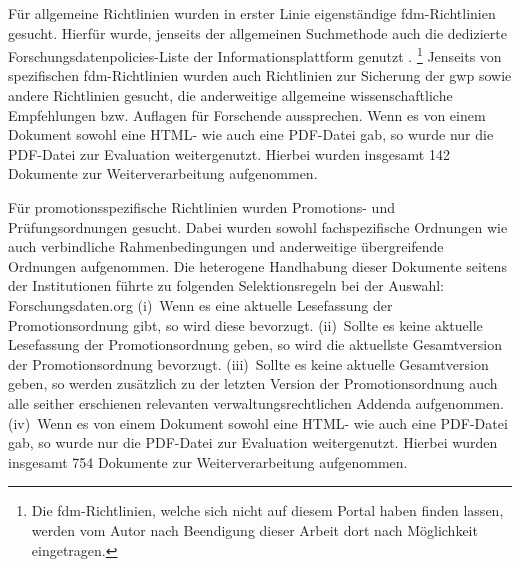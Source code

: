 Für allgemeine Richtlinien wurden in erster Linie eigenständige \gls{fdm}-Richtlinien gesucht.
Hierfür wurde, jenseits der allgemeinen Suchmethode auch die dedizierte Forschungsdatenpolicies-Liste der Informationsplattform \citeauthor{Forschungsdaten2024} genutzt \autocite{Forschungsdaten2024}.%
\footnote{%
    Die \gls{fdm}-Richtlinien, welche sich nicht auf diesem Portal haben finden lassen, werden vom Autor nach Beendigung dieser Arbeit dort nach Möglichkeit eingetragen.%
}
Jenseits von spezifischen \gls{fdm}-Richtlinien wurden auch Richtlinien zur Sicherung der \gls{gwp} sowie andere Richtlinien gesucht, die anderweitige allgemeine wissenschaftliche Empfehlungen bzw. Auflagen für Forschende aussprechen.
Wenn es von einem Dokument sowohl eine HTML- wie auch eine PDF-Datei gab, so wurde nur die PDF-Datei zur Evaluation weitergenutzt.
Hierbei wurden insgesamt \num{142} Dokumente zur Weiterverarbeitung aufgenommen.

Für promotionsspezifische Richtlinien wurden Promotions- und Prüfungsordnungen gesucht.
Dabei wurden sowohl fachspezifische Ordnungen wie auch verbindliche Rahmenbedingungen und anderweitige übergreifende Ordnungen aufgenommen.
Die heterogene Handhabung dieser Dokumente seitens der Institutionen führte zu folgenden Selektionsregeln bei der Auswahl:
Forschungsdaten.org
(i)~Wenn es eine aktuelle Lesefassung der Promotionsordnung gibt, so wird diese bevorzugt.
(ii)~Sollte es keine aktuelle Lesefassung der Promotionsordnung geben, so wird die aktuellste Gesamtversion der Promotionsordnung bevorzugt.
(iii)~Sollte es keine aktuelle Gesamtversion geben, so werden zusätzlich zu der letzten Version der Promotionsordnung auch alle seither erschienen relevanten verwaltungsrechtlichen Addenda aufgenommen.
(iv)~Wenn es von einem Dokument sowohl eine HTML- wie auch eine PDF-Datei gab, so wurde nur die PDF-Datei zur Evaluation weitergenutzt.
Hierbei wurden insgesamt \num{754} Dokumente zur Weiterverarbeitung aufgenommen.

